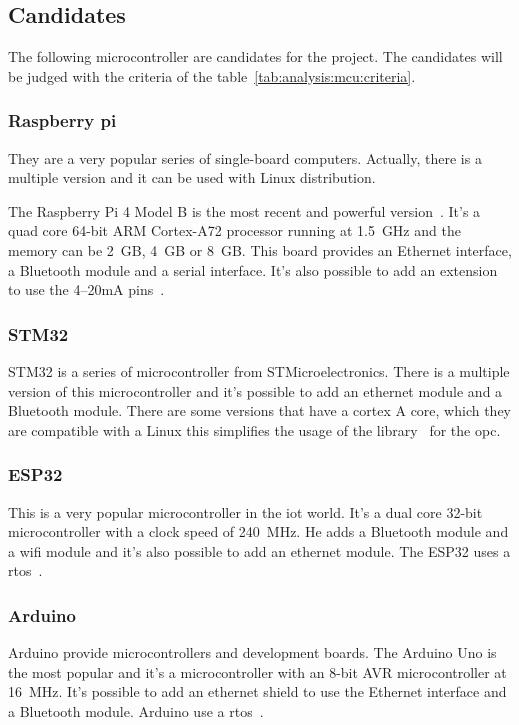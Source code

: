 \subsection{Candidates}
\label{subsec:candidates}
The following microcontroller are candidates for the project.
The candidates will be judged with the criteria of the table~\ref{tab:analysis:mcu:criteria}.

\subsubsection{Raspberry pi}
\label{subsubsec:mcu:candidates:pi}
They are a very popular series of single-board computers.
Actually, there is a multiple version and it can be used with Linux distribution.

The Raspberry Pi 4 Model B is the most recent and powerful version~\cite{pi4}.
It's a quad core 64-bit ARM Cortex-A72 processor running at 1.5~GHz and the memory can be 2~GB, 4~GB or 8~GB\@.
This board provides an Ethernet interface, a Bluetooth module and a serial interface.
It's also possible to add an extension to use the 4--20mA pins~\cite{ncdio_2022}.


\subsubsection{STM32}
\label{subsubsec:mcu:candidates:stm32}
STM32 is a series of microcontroller from STMicroelectronics.
There is a multiple version of this microcontroller and it's possible to add an ethernet module and a Bluetooth module.
There are some versions that have a cortex A core, which they are compatible with a Linux this simplifies the usage of the library~\cite{open62541_2023} for the \acrshort{opc}.

\subsubsection{ESP32}
\label{subsubsec:mcu:candidates:esp32}
This is a very popular microcontroller in the \acrfull{iot} world.
It's a dual core 32-bit microcontroller with a clock speed of 240~MHz.
He adds a Bluetooth module and a wifi module and it's also possible to add an ethernet module.
The ESP32 uses a \acrfull{rtos}~\cite{rtos_2023}.

\subsubsection{Arduino}
\label{subsubsec:mcu:candidates:arduino}
Arduino provide microcontrollers and development boards.
The Arduino Uno is the most popular and it's a microcontroller with an 8-bit AVR microcontroller at 16~MHz.
It's possible to add an ethernet shield to use the Ethernet interface and a Bluetooth module.
Arduino use a \acrfull{rtos}~\cite{rtos_2023}.

